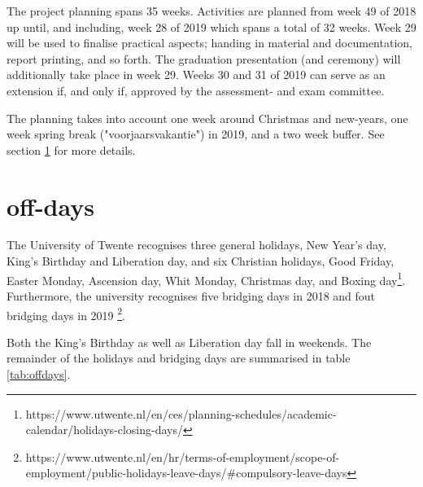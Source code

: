 The project planning spans 35 weeks. Activities are planned from week 49 of 2018 up until, and including, week 28 of 2019 which spans a total of 32 weeks. Week 29 will be used to finalise practical aspects; handing in material and documentation, report printing, and so forth. The graduation presentation (and ceremony) will additionally take place in week 29. Weeks 30 and 31 of 2019 can serve as an extension if, and only if, approved by the assessment- and exam committee.

The planning takes into account one week around Christmas and new-years, one week spring break ("voorjaarsvakantie") in 2019, and a two week buffer. See section \ref{sec:off-days} for more details.
\newpage
\section{off-days} \label{sec:off-days}
The University of Twente recognises three general holidays, New Year's day, King's Birthday and Liberation day, and six Christian holidays, Good Friday, Easter Monday, Ascension day, Whit Monday, Christmas day, and Boxing day\footnote{\label{fn:web_holi} https://www.utwente.nl/en/ces/planning-schedules/academic-calendar/holidays-closing-days/}. Furthermore, the university recognises five bridging days in 2018 and fout bridging days in 2019 \footnote{\label{fn:col_clos} \raggedright https://www.utwente.nl/en/hr/terms-of-employment/scope-of-employment/public-holidays-leave-days/\#compulsory-leave-days}. 

Both the King's Birthday as well as Liberation day fall in weekends. The remainder of the holidays and bridging days are summarised in table \ref{tab:offdays}.

